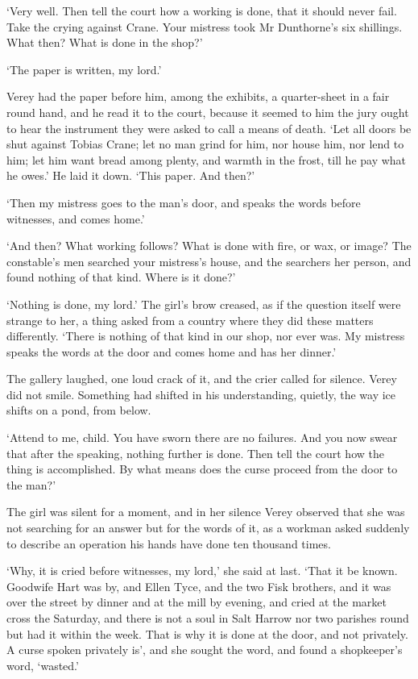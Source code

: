 \documentclass[11pt]{article}
\begin{document}
`Very well. Then tell the court how a working is done, that it should never fail. Take the crying against Crane. Your mistress took Mr Dunthorne's six shillings. What then? What is done in the shop?'

`The paper is written, my lord.'

Verey had the paper before him, among the exhibits, a quarter-sheet in a fair round hand, and he read it to the court, because it seemed to him the jury ought to hear the instrument they were asked to call a means of death. `Let all doors be shut against Tobias Crane; let no man grind for him, nor house him, nor lend to him; let him want bread among plenty, and warmth in the frost, till he pay what he owes.' He laid it down. `This paper. And then?'

`Then my mistress goes to the man's door, and speaks the words before witnesses, and comes home.'

`And then? What working follows? What is done with fire, or wax, or image? The constable's men searched your mistress's house, and the searchers her person, and found nothing of that kind. Where is it done?'

`Nothing is done, my lord.' The girl's brow creased, as if the question itself were strange to her, a thing asked from a country where they did these matters differently. `There is nothing of that kind in our shop, nor ever was. My mistress speaks the words at the door and comes home and has her dinner.'

The gallery laughed, one loud crack of it, and the crier called for silence. Verey did not smile. Something had shifted in his understanding, quietly, the way ice shifts on a pond, from below.

`Attend to me, child. You have sworn there are no failures. And you now swear that after the speaking, nothing further is done. Then tell the court how the thing is accomplished. By what means does the curse proceed from the door to the man?'

The girl was silent for a moment, and in her silence Verey observed that she was not searching for an answer but for the words of it, as a workman asked suddenly to describe an operation his hands have done ten thousand times.

`Why, it is cried before witnesses, my lord,' she said at last. `That it be known. Goodwife Hart was by, and Ellen Tyce, and the two Fisk brothers, and it was over the street by dinner and at the mill by evening, and cried at the market cross the Saturday, and there is not a soul in Salt Harrow nor two parishes round but had it within the week. That is why it is done at the door, and not privately. A curse spoken privately is', and she sought the word, and found a shopkeeper's word, `wasted.'
\end{document}
